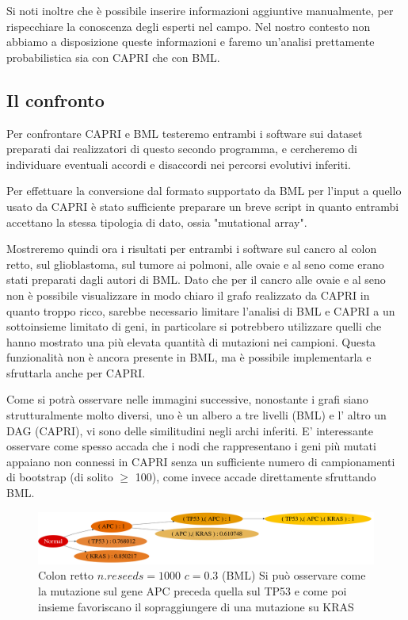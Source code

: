 \documentclass[a4paper]{article}
\begin{document}
	Si noti inoltre che è possibile inserire informazioni aggiuntive manualmente, per rispecchiare la conoscenza degli esperti nel campo.
	Nel nostro contesto non abbiamo a disposizione queste informazioni e faremo un'analisi prettamente probabilistica sia con CAPRI che con BML.

	\subsection{\large Il confronto}	

	Per confrontare CAPRI e BML testeremo entrambi i software sui dataset preparati dai realizzatori di questo secondo programma,
	e cercheremo di individuare eventuali accordi e disaccordi nei percorsi evolutivi inferiti. 
	
	Per effettuare la conversione dal formato supportato da BML per l'input a quello usato da CAPRI è stato sufficiente preparare un breve
	script in quanto entrambi accettano la stessa tipologia di dato, ossia "mutational array". 

	Mostreremo quindi ora i risultati per entrambi i software sul cancro al colon retto, sul glioblastoma, sul tumore ai polmoni, alle ovaie e al seno come
	erano stati preparati dagli autori di BML. 
	Dato che per il cancro alle ovaie e al seno non è possibile visualizzare in modo chiaro il grafo realizzato da CAPRI in quanto troppo ricco, 
	sarebbe necessario limitare l'analisi di BML e CAPRI a un sottoinsieme limitato di geni, in particolare si potrebbero utilizzare quelli che 
	hanno mostrato una più elevata quantità di mutazioni nei campioni. Questa funzionalità non è ancora presente in BML, ma è possibile implementarla
	e sfruttarla anche per CAPRI.

	Come si potrà osservare nelle immagini successive, nonostante i grafi siano strutturalmente molto diversi, uno è un albero a tre livelli (BML) e l' altro un 
	DAG (CAPRI), vi sono delle similitudini negli archi inferiti. E' interessante osservare come spesso accada che i nodi che rappresentano i
	geni più mutati appaiano non connessi in CAPRI senza un sufficiente numero di campionamenti di bootstrap (di solito $\ge$ 100), come invece accade 
	direttamente sfruttando BML. 
	

	\begin{figure}[H]
	  \centering
	  \includegraphics[scale=0.16, keepaspectratio]{COL_RESIC.png}%
	  \captionsetup{justification=centering,margin=0.5cm}
	  \caption{Colon retto $n.reseeds=1000$ $c=0.3$ (BML) Si può osservare come la mutazione sul gene APC preceda quella sul TP53 e come poi insieme favoriscano il sopraggiungere di una mutazione su KRAS} 
	\end{figure}
\end{document}
